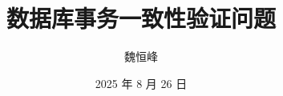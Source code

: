 \documentclass[]{beamer}
\title[]{数据库事务一致性验证问题}
\subtitle{\teal{(前沿技术与发展趋势探讨)}}
\author[魏恒峰]{魏恒峰}
\institute{hengfeng\_wei@126.com}
\date{2025 年 8 月 26 日}
\begin{document}
\maketitle





\thankyou{}
\end{document}
